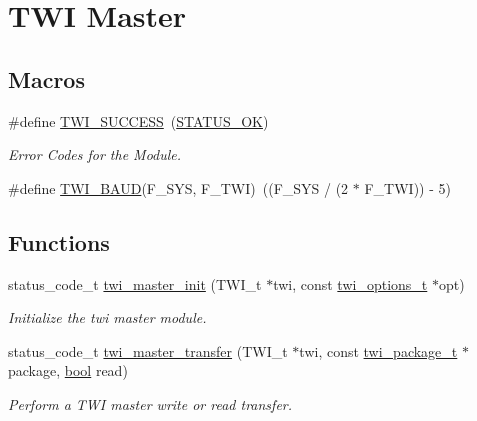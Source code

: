 \hypertarget{group__group__xmega__drivers__twi__twim}{\section{T\-W\-I Master}
\label{group__group__xmega__drivers__twi__twim}
}
\subsection*{Macros}
\begin{DoxyCompactItemize}
\item 
\#define \hyperlink{group__group__xmega__drivers__twi__twim_gae4fbb549f8f2ecf379b60922b20e911f}{T\-W\-I\-\_\-\-S\-U\-C\-C\-E\-S\-S}~(\hyperlink{group__group__xmega__utils__status__codes_gga751c892e5a46b8e7d282085a5a5bf151a7e4a42e3b6dd63708c64cf3db6f69566}{S\-T\-A\-T\-U\-S\-\_\-\-O\-K})
\begin{DoxyCompactList}\small\item\em Error Codes for the Module. \end{DoxyCompactList}\item 
\#define \hyperlink{group__group__xmega__drivers__twi__twim_gaf373fdbc2054cf1a070ba2a24ddaedf3}{T\-W\-I\-\_\-\-B\-A\-U\-D}(F\-\_\-\-S\-Y\-S, F\-\_\-\-T\-W\-I)~((F\-\_\-\-S\-Y\-S / (2 $\ast$ F\-\_\-\-T\-W\-I)) -\/ 5)
\end{DoxyCompactItemize}
\subsection*{Functions}
\begin{DoxyCompactItemize}
\item 
status\-\_\-code\-\_\-t \hyperlink{group__group__xmega__drivers__twi__twim_ga8029a07f3322bf43c289f5acb442ef29}{twi\-\_\-master\-\_\-init} (T\-W\-I\-\_\-t $\ast$twi, const \hyperlink{structtwi__options__t}{twi\-\_\-options\-\_\-t} $\ast$opt)
\begin{DoxyCompactList}\small\item\em Initialize the twi master module. \end{DoxyCompactList}\item 
status\-\_\-code\-\_\-t \hyperlink{group__group__xmega__drivers__twi__twim_ga87be99eb2911dfaecceda6521c0818b2}{twi\-\_\-master\-\_\-transfer} (T\-W\-I\-\_\-t $\ast$twi, const \hyperlink{structtwi__package__t}{twi\-\_\-package\-\_\-t} $\ast$package, \hyperlink{group__group__xmega__utils_ga97a80ca1602ebf2303258971a2c938e2}{bool} read)
\begin{DoxyCompactList}\small\item\em Perform a T\-W\-I master write or read transfer. \end{DoxyCompactList}\end{DoxyCompactItemize}


